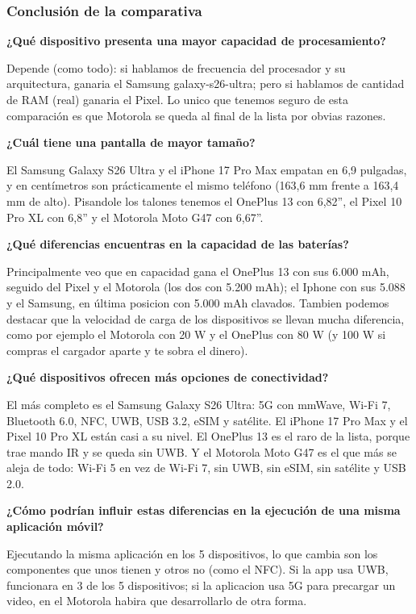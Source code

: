\documentclass[11pt,a4paper]{article}
\newcommand{\campo}[1]{\textbf{\color{ink}#1}}
\begin{document}
	\subsubsection*{Conclusión de la comparativa}
	
	\campo{¿Qué dispositivo presenta una mayor capacidad de procesamiento?}
	
	Depende (como todo): si hablamos de frecuencia del procesador y su arquitectura, ganaria el Samsung galaxy-s26-ultra; pero si hablamos de cantidad de RAM (real) ganaria el Pixel. Lo unico que tenemos seguro de esta comparación es que Motorola se queda al final de la lista por obvias razones.
	
	\campo{¿Cuál tiene una pantalla de mayor tamaño?}
	
	El Samsung Galaxy S26 Ultra y el iPhone 17 Pro Max empatan en 6,9 pulgadas, y en centímetros son prácticamente el mismo teléfono (163,6 mm frente a 163,4 mm de alto). Pisandole los talones tenemos el OnePlus 13 con 6,82'', el Pixel 10 Pro XL con 6,8'' y el Motorola Moto G47 con 6,67''.
	
	\campo{¿Qué diferencias encuentras en la capacidad de las baterías?}
	
	Principalmente veo que en capacidad gana el OnePlus 13 con sus 6.000 mAh, seguido del Pixel y el Motorola (los dos con 5.200 mAh); el Iphone con sus 5.088 y el Samsung, en última posicion con 5.000 mAh clavados. Tambien podemos destacar que la velocidad de carga de los dispositivos se llevan mucha diferencia, como por ejemplo el Motorola con 20 W y el OnePlus con 80 W (y 100 W si compras el cargador aparte y te sobra el dinero).
	
	\campo{¿Qué dispositivos ofrecen más opciones de conectividad?}
	
	El más completo es el Samsung Galaxy S26 Ultra: 5G con mmWave, Wi-Fi 7, Bluetooth 6.0, NFC, UWB, USB 3.2, eSIM y satélite. El iPhone 17 Pro Max y el Pixel 10 Pro XL están casi a su nivel. El OnePlus 13 es el raro de la lista, porque trae mando IR y se queda sin UWB. Y el Motorola Moto G47 es el que más se aleja de todo: Wi-Fi 5 en vez de Wi-Fi 7, sin UWB, sin eSIM, sin satélite y USB 2.0.
	
	\campo{¿Cómo podrían influir estas diferencias en la ejecución de una misma aplicación móvil?}
	
	Ejecutando la misma aplicación en los 5 dispositivos, lo que cambia son los componentes que unos tienen y otros no (como el NFC). Si la app usa UWB, funcionara en 3 de los 5 dispositivos; si la aplicacion usa 5G para precargar un video, en el Motorola habira que desarrollarlo de otra forma.
	
\end{document}
